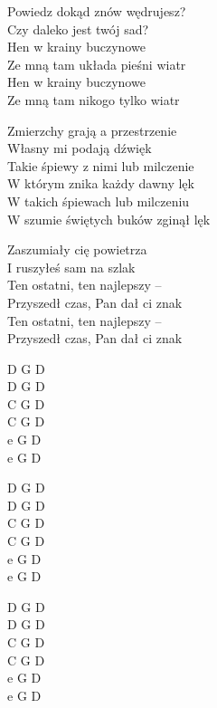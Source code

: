 \begin{text}
    Powiedz dokąd znów wędrujesz?\\
    Czy daleko jest twój sad?\\
    Hen w krainy buczynowe\\
    Ze mną tam układa pieśni wiatr\\
    Hen w krainy buczynowe\\
    Ze mną tam nikogo tylko wiatr

    Zmierzchy grają a przestrzenie\\
    Własny mi podają dźwięk\\
    Takie śpiewy z nimi lub milczenie\\
    W którym znika każdy dawny lęk\\
    W takich śpiewach lub milczeniu\\
    W szumie świętych buków zginął lęk

    Zaszumiały cię powietrza\\
    I ruszyłeś sam na szlak\\
    Ten ostatni, ten najlepszy –\\
    Przyszedł czas, Pan dał ci znak\\
    Ten ostatni, ten najlepszy –\\
    Przyszedł czas, Pan dał ci znak
\end{text}
\begin{chord}
    D G D\\
    D G D\\
    C G D\\
    C G D\\
    e G D\\
    e G D

    D G D\\
    D G D\\
    C G D\\
    C G D\\
    e G D\\
    e G D

    D G D\\
    D G D\\
    C G D\\
    C G D\\
    e G D\\
    e G D
\end{chord}